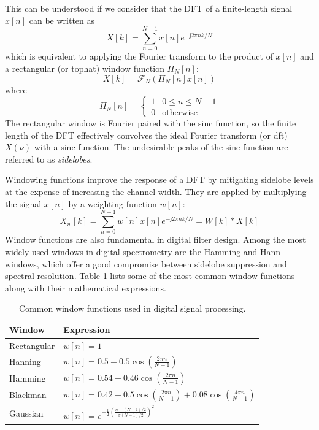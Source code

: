 This can be understood if we consider that the DFT of a finite-length signal $x[n]$ can be written as
\begin{equation}
	X[k] = \sum_{n=0}^{N-1} x[n] e^{-\mathrm{j} 2\pi n k / N}
\end{equation}
which is equivalent to applying the Fourier transform to the product of $x[n]$ and a rectangular (or tophat) window function $\Pi_N[n]$:
\begin{equation}
	X[k] = \mathcal{F}_N \left( \Pi_N[n] x[n] \right)
\end{equation}
where
\begin{equation}
	\Pi_N[n] =
	\begin{cases}
		1 & 0 \leq n \leq N-1 \\
		0 & \text{otherwise}
	\end{cases}
\end{equation}
The rectangular window is Fourier paired with the sinc function, so the finite length of the DFT effectively convolves the ideal Fourier transform (or \gls{dft}) $X(\nu)$ with a sinc function. The undesirable peaks of the sinc function are referred to as \emph{sidelobes}.

Windowing functions improve the response of a DFT by mitigating sidelobe levels at the expense of increasing the channel width. They are applied by multiplying the signal $x[n]$ by a weighting function $w[n]$:
\begin{equation}
	X_w[k] = \sum_{n=0}^{N-1} w[n] x[n] e^{-\mathrm{j} 2\pi n k / N} = W[k] * X[k]
\end{equation}
Window functions are also fundamental in digital filter design. Among the most widely used windows in digital spectrometry are the Hamming and Hann windows, which offer a good compromise between sidelobe suppression and spectral resolution. Table \ref{tab:window_functions} lists some of the most common window functions along with their mathematical expressions. 

\begin{table}[h!]
	\centering
	\begin{tabular}{ll}
		\toprule
		\textbf{Window} & \textbf{Expression} \\
		\midrule
		Rectangular & $w[n] = 1$ \\
		Hanning & $w[n] = 0.5 - 0.5 \cos\left(\frac{2\pi n}{N-1}\right)$ \\
		Hamming & $w[n] = 0.54 - 0.46 \cos\left(\frac{2\pi n}{N-1}\right)$ \\
		Blackman & $w[n] = 0.42 - 0.5 \cos\left(\frac{2\pi n}{N-1}\right) + 0.08 \cos\left(\frac{4\pi n}{N-1}\right)$ \\
		Gaussian & $w[n] = e^{-\frac{1}{2} \left(\frac{n - (N-1)/2}{\sigma (N-1)/2}\right)^2}$ \\
	\end{tabular}
	\label{tab:window_functions}
	\caption{Common window functions used in digital signal processing.}
\end{table}


